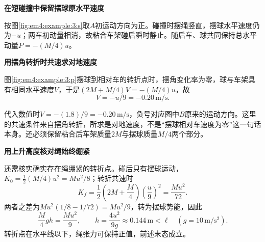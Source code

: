 \begin{solution}\textbf{在短碰撞中保留摆球原水平速度}\par\nobreak
按图\ref{fig:em4:example:3:s}取$A$初运动方向为正。碰撞时摆绳竖直，摆球水平速度仍为$-u$；两车初动量相消，故粘合车架碰后瞬时静止。随后车、球共同保持总水平动量$P=-(M/4)u$。



\par\medskip{}\noindent\textbf{用摆角转折时共速求对地速度}\par\nobreak
图\ref{fig:em4:example:3:p}摆球到相对车的转折点时，摆角变化率为零，球与车架具有相同水平速度$V$，于是$(2M+M/4)V=-(M/4)u$，故
\[\boxed{V=-u/9=-0.20\,\mathrm{m/s}}.\]

代入数值时$V=-(1.8)/9=-0.20\,\mathrm{m/s}$，负号对应图中$B$原来的运动方向。这里的共速条件来自摆角转折，所求是对地速度，不是“摆球相对车速度为零”这一句话本身。还必须保留粘合后车架质量$2M$与摆球质量$M/4$两个部分。



\par\medskip{}\noindent\textbf{用上升高度核对绳始终绷紧}\par\nobreak
还需核实确实存在绳绷紧的转折点。碰后只有摆球运动，$K_0=\tfrac12(M/4)u^2=Mu^2/8$；转折共速时
\[
K_f=\frac12\left(2M+\frac M4\right)\left(\frac u9\right)^2
=\frac{Mu^2}{72}.
\]
两者之差为$Mu^2(1/8-1/72)=Mu^2/9$，转为摆球势能，因此
\[
\frac M4gh=\frac{Mu^2}{9},\qquad
h=\frac{4u^2}{9g}\approx0.144\,\mathrm m<\ell
\quad(g=10\,\mathrm{m/s^2}).
\]
转折点在水平线以下，绳张力可保持正值，前述末态成立。\end{solution}
